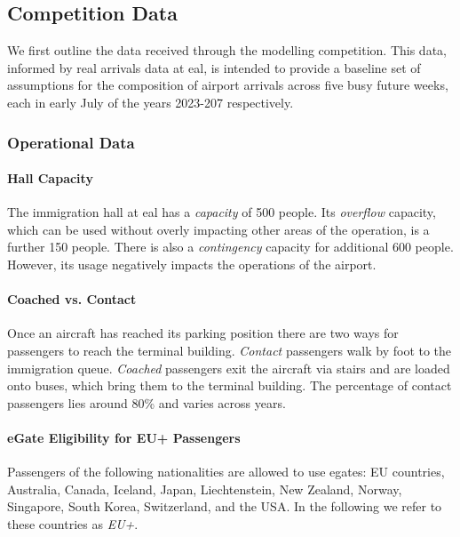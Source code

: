 \documentclass[10pt]{article}
\begin{document}
\subsection{Competition Data}

We first outline the data received through the modelling competition. This data, informed by real arrivals data at \gls{eal}, is intended to provide a baseline set of assumptions for the composition of airport arrivals across five busy future weeks, each in early July of the years 2023-207 respectively.

\subsubsection{Operational Data}

\paragraph{Hall Capacity}
The immigration hall at \gls{eal} has a \textit{capacity} of 500 people. Its \textit{overflow} capacity, which can be used without overly impacting other areas of the operation, is a further 150 people. There is also a \textit{contingency} capacity for additional 600 people. However, its usage negatively impacts the operations of the airport.

\paragraph{Coached vs. Contact}
Once an aircraft has reached its parking position there are two ways for passengers to reach the terminal building. \textit{Contact} passengers walk by foot to the immigration queue. \textit{Coached} passengers exit the aircraft via stairs and are loaded onto buses, which bring them to the terminal building. The percentage of contact passengers lies around 80\% and varies across years.

\paragraph{eGate Eligibility for EU+ Passengers}
Passengers of the following nationalities are allowed to use \glspl{egate}: EU countries, Australia, Canada, Iceland, Japan, Liechtenstein, New Zealand, Norway, Singapore, South Korea, Switzerland, and the USA. In the following we refer to these countries as \textit{EU+}. 
\end{document}
